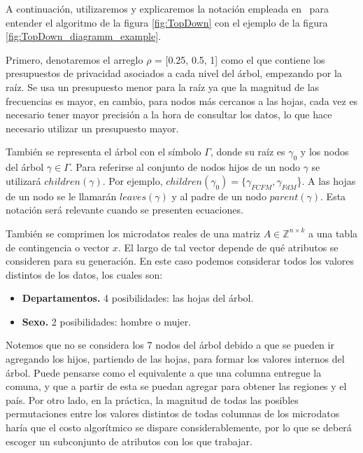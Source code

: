 \documentclass[informe]{upropuesta}
\begin{document}
A continuación, utilizaremos y explicaremos la notación empleada en~\cite{Abowd2022} para entender el algoritmo de la figura \ref{fig:TopDown} con el ejemplo de la figura \ref{fig:TopDown_diagramm_example}. 

Primero, denotaremos el arreglo $\rho$ = [0.25, 0.5, 1] como el que contiene los presupuestos de privacidad asociados a cada nivel del árbol, empezando por la raíz. Se usa un presupuesto menor para la raíz ya que la magnitud de las frecuencias es mayor, en cambio, para nodos más cercanos a las hojas, cada vez es necesario tener mayor precisión a la hora de consultar los datos, lo que hace necesario utilizar un presupuesto mayor.

También se representa el árbol con el símbolo $\Gamma$, donde su raíz es $\gamma_{0}$ y los nodos del árbol $\gamma \in \Gamma$. Para referirse al conjunto de nodos hijos de un nodo $\gamma$ se utilizará $\mathit{children(\gamma)}$. Por ejemplo, $\mathit{children(\gamma_{0})} = \{\gamma_{FCFM}, \gamma_{FdM}$\}. A las hojas de un nodo se le llamarán $\mathit{leaves(\gamma)}$ y al padre de un nodo $\mathit{parent(\gamma)}$. Esta notación será relevante cuando se presenten ecuaciones.

También se comprimen los microdatos reales de una matriz \(A \in \mathbb{Z}^{n \times k}\) a una tabla de contingencia o vector $x$.
 El largo de tal vector depende de qué atributos se consideren para su generación. En este caso podemos considerar todos los valores distintos de los datos, los cuales son:

\begin{itemize}
    \item \textbf{Departamentos.} 4 posibilidades: las hojas del árbol.
    \item \textbf{Sexo.} 2 posibilidades: hombre o mujer.
\end{itemize}


 Notemos que no se considera los 7 nodos del árbol debido a que se pueden ir agregando los hijos, partiendo de las hojas, para formar los valores internos del árbol. Puede pensarse como el equivalente a que una columna entregue la comuna, y que a partir de esta se puedan agregar para obtener las regiones y el país. Por otro lado, en la práctica, la magnitud de todas las posibles permutaciones entre los valores distintos de todas columnas de los microdatos haría que el costo algorítmico se dispare considerablemente, por lo que se deberá escoger un subconjunto de atributos con los que trabajar.
 
\end{document}
